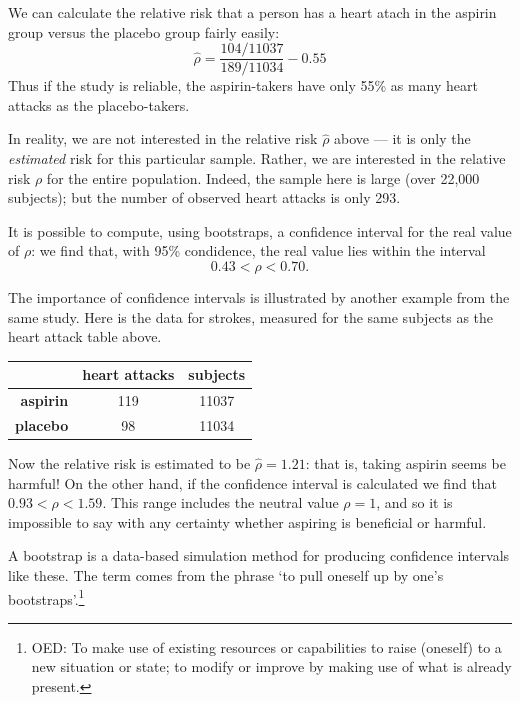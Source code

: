 \documentclass[a4paper,leqno]{article}
\numberwithin{equation}{section}
\theoremstyle{definition}
\theoremstyle{remark}
\begin{document}
We can calculate the relative risk that a person has a heart atach in the aspirin
group versus the placebo group fairly easily:
\begin{displaymath}
  \hat\rho = \frac{104/11037}{189/11034} - 0.55
\end{displaymath}
Thus if the study is reliable, the aspirin-takers have only 55\% as many heart attacks
as the placebo-takers.

In reality, we are not interested in the relative risk $ \hat\rho $ above --- it is only
the \emph{estimated} risk for this particular sample. Rather, we are interested in the relative
risk $ \rho $ for the entire population. Indeed, the sample here is large (over 22,000 subjects);
but the number of observed heart attacks is only 293.

It is possible to compute, using bootstraps, a confidence interval for the real value of $ \rho $:
we find that, with 95\% condidence, the real value lies within the interval
\begin{displaymath}
  0.43 < \rho < 0.70.
\end{displaymath}

The importance of confidence intervals is illustrated by another example from the same study. Here
is the data for strokes, measured for the same subjects as the heart attack table above.
\begin{center}
  \begin{tabular}{r|cc}
    & \textbf{heart attacks} & \textbf{subjects}\\\hline
    \textbf{aspirin} & 119 & 11037\\
    \textbf{placebo} & 98 & 11034
  \end{tabular}
\end{center}
Now the relative risk is estimated to be $ \hat\rho = 1.21 $: that is, taking aspirin seems be harmful! On the other
hand, if the confidence interval is calculated we find that $ 0.93 < \rho < 1.59 $. This range includes the neutral
value $ \rho = 1 $, and so it is impossible to say with any certainty whether aspiring is beneficial or harmful.

A bootstrap is a data-based simulation method for producing confidence intervals like these. The term comes from the
phrase `to pull oneself up by one's bootstraps'.\footnote{OED: To make use of existing resources or capabilities to raise (oneself)
to a new situation or state; to modify or improve by making use of what is already present.}
\end{document}
